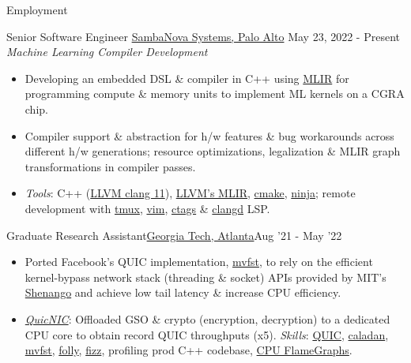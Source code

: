 \documentclass[]{mcdowellcv}
\begin{document}
    \makeheader

    \begin{cvsection}{Employment}

        \begin{cvsubsection}
          {Senior Software Engineer}
          {\href{https://sambanova.ai/}{SambaNova Systems, Palo Alto}}
          {May 23, 2022 - Present}
            \textit{Machine Learning Compiler Development}
            \begin{itemize}
                \item Developing an embedded DSL \& compiler in C++ using
                  \href{https://mlir.llvm.org/}{MLIR} for programming compute
                  \& memory units to implement ML kernels on a CGRA chip.
                \item Compiler support \& abstraction for h/w features \& bug workarounds across different h/w generations; resource optimizations, legalization \& MLIR graph transformations in compiler passes.
                \item \textit{Tools}: C++ (\href{https://clang.llvm.org/}{LLVM clang 11}), \href{https://mlir.llvm.org/}{LLVM's MLIR}, \href{https://cmake.org/}{cmake}, \href{https://ninja-build.org/}{ninja};
                    remote development with \href{https://github.com/tmux/tmux}{tmux}, \href{https://www.vim.org/}{vim}, \href{https://github.com/universal-ctags/ctags}{ctags} \& \href{https://clangd.llvm.org/}{clangd} LSP.
            \end{itemize}
        \end{cvsubsection}

        \begin{cvsubsection}{Graduate Research Assistant}{\href{https://scs.gatech.edu/}{Georgia Tech, Atlanta}}{Aug '21 - May '22}
            \begin{itemize}
                \item Ported Facebook's QUIC implementation, \href{https://github.com/facebookincubator/mvfst}{mvfst}, to rely on the efficient kernel-bypass network stack (threading \& socket) APIs provided by MIT's \href{https://www.usenix.org/conference/nsdi19/presentation/ousterhout}{Shenango} and achieve low tail latency \& increase CPU efficiency.
                \item \href{https://github.com/saubhik/caladan/pulls}{\textit{QuicNIC}}: Offloaded GSO \& crypto (encryption, decryption) to a dedicated CPU core to obtain record QUIC throughputs (x5). \textit{Skills}:
                \href{https://quicwg.org/}{QUIC},
                \href{https://github.com/shenango/caladan}{caladan}, \href{https://github.com/facebookincubator/mvfst}{mvfst}, \href{https://github.com/facebook/folly}{folly}, \href{https://github.com/facebookincubator/fizz}{fizz}, profiling prod C++ codebase, \href{https://www.brendangregg.com/FlameGraphs/cpuflamegraphs.html}{CPU FlameGraphs}.
            \end{itemize}
        \end{cvsubsection}


\end{cvsection}
\end{document}
